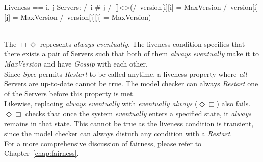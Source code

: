 \begin{tla}
Liveness == 
    \E i, j \in Servers: 
        /\ i # j
        /\ []<>(/\ version[i][i] = MaxVersion
                /\ version[i][j] = MaxVersion
                /\ version[j][j] = MaxVersion)
\end{tla}
\begin{tlatex}
%
%
%
%
%
\end{tlatex}
\\

The $\Box\Diamond$ represents \textit{always eventually}. The liveness condition
specifies that there exists a pair of Servers such that both of them
\textit{always eventually} make it to \textit{MaxVersion} and have
\textit{Gossip} with each other.\\

Since \textit{Spec} permits \textit{Restart} to be called anytime, a liveness
property where \textit{all} Servers are up-to-date cannot be true. The model
checker can always \textit{Restart} one of the Servers before this property is
met.\\

Likewise, replacing \textit{always eventually} with \textit{eventually always}
($\Diamond\Box$) also fails. $\Diamond\Box$ checks that once the system
\textit{eventually} enters a specified state, it \textit{always} remains in that
state. This cannot be true as the liveness condition is transient, since the
model checker can always disturb any condition with a \textit{Restart}.\\

For a more comprehensive discussion of fairness, please refer to
Chapter~\ref{chap:fairness}.

% 
